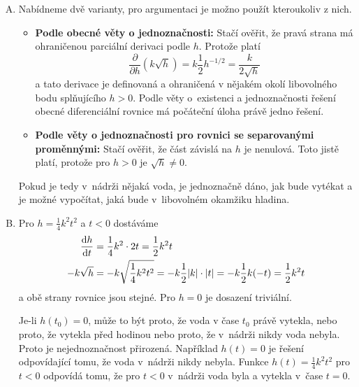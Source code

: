 \reseni
\begin{enumerate}[A)]
\item Nabídneme dvě  varianty, pro argumentaci je možno použít kteroukoliv z nich. 
  \begin{itemize}
  \item \textbf{Podle obecné věty o jednoznačnosti:} Stačí ověřit, že pravá strana má ohraničenou parciální derivaci podle $h$. Protože platí
    $$\frac{\partial }{\partial h}(k\sqrt h)=k\frac 12
    h^{-1/2}=\frac{k}{2\sqrt h}$$ a tato derivace je definovaná a
    ohraničená v nějakém okolí libovolného bodu splňujícího $h>0$.
    Podle věty o existenci a jednoznačnosti řešení obecné
    diferenciální rovnice má počáteční úloha právě jedno řešení.
  \item \textbf{Podle věty o jednoznačnosti pro rovnici se separovanými proměnnými: } Stačí ověřit,
    že část závislá na $h$ je nenulová. Toto jistě platí, protože pro
    $h>0$ je $\sqrt{h}\neq 0$.
\end{itemize}
Pokud je tedy v nádrži nějaká voda, je jednoznačně dáno,
    jak bude vytékat a je možné vypočítat, jaká bude v libovolném
    okamžiku hladina.
  
\item
  Pro $h=\frac 14 k^2 t^2$ a $t<0$ dostáváme
  \begin{equation*}
    \begin{aligned}
      \frac{\mathrm dh}{\mathrm dt}&=\frac 14 k^2 \cdot 2t = \frac 12 k^2 t\\
      -k\sqrt h&=-k\sqrt{\frac 14 k^2 t^2} = - k \frac 12 |k| \cdot |t| =
      - k \frac 12 k (-t) = \frac 12 k^2 t
    \end{aligned}
  \end{equation*}
  a obě strany rovnice jsou stejné. Pro $h=0$ je dosazení triviální.
  
  Je-li $h(t_0)=0$, může to být proto, že voda v čase $t_0$ právě vytekla, nebo proto, že vytekla před hodinou nebo proto, že v nádrži nikdy voda nebyla. Proto je nejednoznačnost přirozená. Například $h(t)=0$ je řešení odpovídající tomu, že voda v nádrži nikdy nebyla. Funkce $h(t)=\frac 14 k^2t^2$ pro $t<0$ odpovídá tomu, že pro $t<0$ v nádrži voda byla a vytekla v čase $t=0$.
\end{enumerate}

\konec


\stranka



